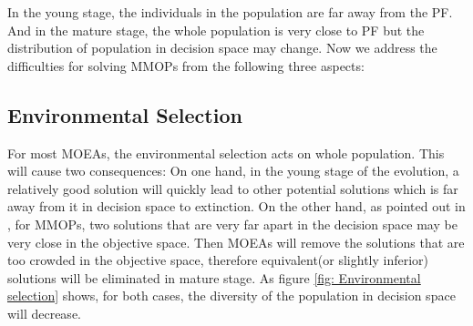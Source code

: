 \documentclass[conference]{IEEEtran}
\begin{document}
In the young stage, the individuals in the population are far away from the PF. And in the mature stage, the whole population is very close to PF but the distribution of population in decision space may change. Now we address the difficulties for solving MMOPs from the following three aspects:

\subsection{Environmental Selection}
\label{Impact of environmental selection}
For most MOEAs, the environmental selection acts on whole population. This will cause two consequences:
On one hand, in the young stage of the evolution, a relatively good solution will quickly lead to other potential solutions which is far away from it in decision space to extinction. 
On the other hand, as pointed out in \cite{Liang2016}, for MMOPs, two solutions that are very far apart in the decision space may be very close in the objective space. Then MOEAs will remove the solutions that are too crowded in the objective space, therefore equivalent(or slightly inferior) solutions will be eliminated in mature stage. As figure \ref{fig: Environmental selection} shows, for both cases, the diversity of the population in decision space will decrease. 
\end{document}
